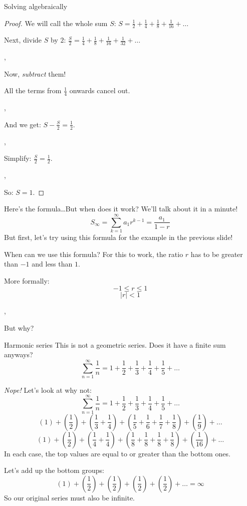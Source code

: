 	\begin{namedframe}{Solving algebraically}
		\begin{proof}
			We will call the whole sum $S$: $S = \frac{1}{2} + \frac{1}{4} + \frac{1}{8} + \frac{1}{16} + \dots$
			\pause

			Next, divide $S$ by $2$: $\frac{S}{2} = \frac{1}{4} + \frac{1}{8} + \frac{1}{16} + \frac{1}{32} + \dots$

			\sep

			Now, \emph{subtract} them!

			All the terms from $\frac{1}{4}$ onwards cancel out.

			\sep
			
			And we get: $S - \frac{S}{2} = \frac{1}{2}$.

			\sep

			Simplify: $\frac{S}{2} = \frac{1}{2}$.

			\sep

			So: $S = 1$.
		\end{proof}
	\end{namedframe}
	\begin{namedframe}{Here's the formula\dots But when does it work?}
		We'll talk about it in a minute!
		\[S_{\infty} = \sum_{k=1}^{\infty}a_1r^{k-1} = \frac{a_1}{1-r}\]
		But first, let's try using this formula for the example in the previous slide!
	\end{namedframe}
	\begin{namedframe}{When can we use this formula?}
		For this to work, the ratio $r$ has to be greater than $-1$ and less than $1$.

		More formally:
		\[-1 \leq r \leq 1\]
		\[|r| < 1\]

		\sep

		But why?
	\end{namedframe}
	\begin{namedframe}{Harmonic series}
		This is not a geometric series. Does it have a finite sum anyways?
		\[\sum_{n=1}^{\infty} \frac{1}{n} = 1 + \frac{1}{2} + \frac{1}{3} + \frac{1}{4} + \frac{1}{5} + \dots\]
	\end{namedframe}
	\begin{namedframe}{\emph{Nope!}}
		Let's look at why not:
		\[\sum_{n=1}^{\infty} \frac{1}{n} = 1 + \frac{1}{2} + \frac{1}{3} + \frac{1}{4} + \frac{1}{5} + \dots\]
		\[(1) + \left(\frac{1}{2}\right) + \left(\frac{1}{3} + \frac{1}{4}\right) + \left(\frac{1}{5} + \frac{1}{6} + \frac{1}{7} + \frac{1}{8}\right) + \left(\frac{1}{9}\right) + \dots\]
		\[(1) + \left(\frac{1}{2}\right) + \left(\frac{1}{4} + \frac{1}{4}\right) + \left(\frac{1}{8} + \frac{1}{8} + \frac{1}{8} + \frac{1}{8}\right) + \left(\frac{1}{16}\right) + \dots\]
		In each case, the top values are equal to or greater than the bottom ones.

		Let's add up the bottom groups:
		\[(1) + \left(\frac{1}{2}\right) + \left(\frac{1}{2}\right) + \left(\frac{1}{2}\right) + \left(\frac{1}{2}\right) + \dots = \infty\]
		So our original series must also be infinite.
	\end{namedframe}
